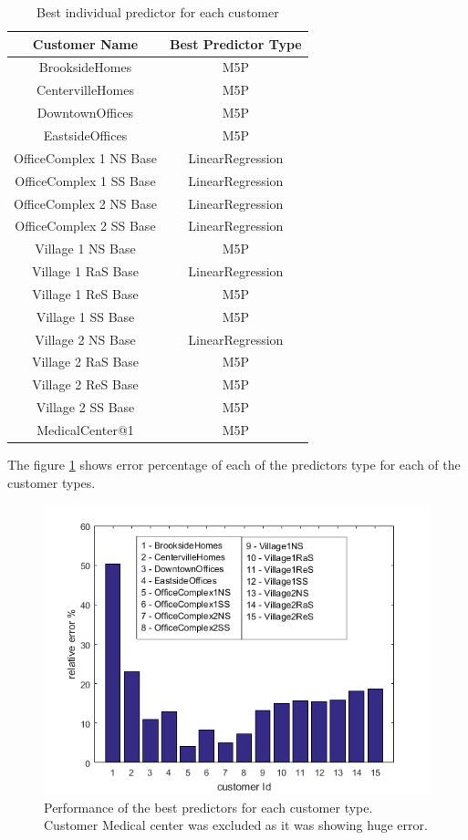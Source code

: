 \begin{table}[h!]
\centering
\begin{tabular}{|c| c|} 
 \hline
 Customer Name & Best Predictor Type \\ [0.5ex] 
 \hline
BrooksideHomes &	M5P \\
CentervilleHomes &	M5P \\
DowntownOffices &	M5P \\
EastsideOffices &	M5P \\
OfficeComplex 1 NS Base &	LinearRegression \\
OfficeComplex 1 SS Base &	LinearRegression \\
OfficeComplex 2 NS Base &	LinearRegression \\
OfficeComplex 2 SS Base &	LinearRegression \\
Village 1 NS Base &	M5P \\
Village 1 RaS Base &	LinearRegression \\
Village 1 ReS Base &	M5P \\
Village 1 SS Base &	M5P \\
Village 2 NS Base &	LinearRegression \\
Village 2 RaS Base &	M5P \\
Village 2 ReS Base &	M5P \\
Village 2 SS Base &	M5P \\
MedicalCenter@1	& M5P \\ [1ex] 
 \hline
\end{tabular}
\caption{Best individual predictor for each customer}
\label{table:1}
\end{table}

The figure \ref{fig:indiv-cutomer-best-predictor-error} shows error percentage of each of the predictors type for each of the customer types.

\begin{figure}[h!]
  \includegraphics[width=\linewidth]{relativeErrorIndivPredictor.png}
  \caption{Performance of the best predictors for each customer type. Customer Medical center was excluded as it was showing huge error. }
  \label{fig:indiv-cutomer-best-predictor-error}
\end{figure}

